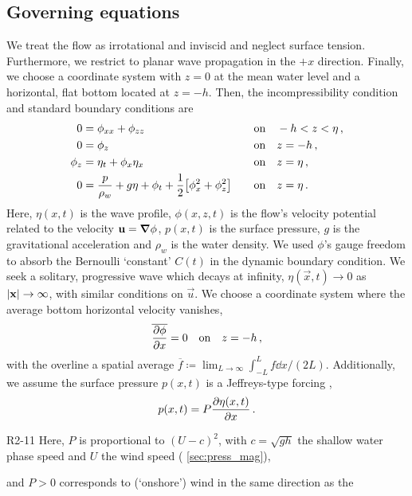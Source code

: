 \documentclass{jfm}
\begin{document}
\subsection{\label{sec:governing} Governing equations}
We treat the flow as irrotational and inviscid and neglect surface
tension.
Furthermore, we restrict to planar wave propagation in the $+x$
direction.
Finally, we choose a coordinate system with $z=0$ at the mean water
level and a horizontal, flat bottom located at $z=-h$.
Then, the incompressibility condition and standard boundary conditions
are
\begin{alignat}{2}
  0 &= \phi_{xx} + \phi_{zz} &&\qq{on}
  -h < z < \eta \,, \label{eq:laplace}\\
  0 &= \phi_{z} &&\qq{on} z=-h \,, \label{eq:bottom_bc}\\
  \phi_{z} &= \eta_{t} + \phi_{x} \eta_{x} &&\qq{on} z = \eta \,,
  \label{eq:kinematic_bc}\\
  0 &= \frac{p}{\rho_w} + g\eta + \phi_{t} +
  \frac{1}{2} \bqty{\phi_{x}^2 + \phi_{z}^2} &&\qq{on} z=
  \eta \,. \label{eq:dynamic_bc}
\end{alignat}
Here, $\eta(x,t)$ is the wave profile, $\phi(x,z,t)$ is the flow's
velocity potential related to the velocity $\mathbf{\bm{u}} = \grad{\phi}$,
$p(x,t)$ is the surface pressure, $g$ is the gravitational acceleration
and $\rho_w$ is the water density.
We used $\phi$'s gauge freedom to absorb the Bernoulli `constant'
$C(t)$ in the dynamic boundary condition.
We seek a solitary, progressive wave which decays at infinity,
$\eta(\vec{x},t) \to 0$ as $\abs{\mathbf{\bm{x}}} \to \infty$, with similar
conditions on $\vec{u}$.
We choose a coordinate system where the average bottom horizontal
velocity vanishes,
\begin{equation}
  \overline{ \pdv{\phi}{x} } = 0 \qq{on} z=-h \,,
  \label{eq:bot_bc_horz}
\end{equation}
with the overline a spatial average $\overline{f} \coloneqq
\lim_{L\to\infty} \int_{-L}^{L} f \dd{x} / (2L)$.
Additionally, we assume the surface pressure $p(x,t)$ is a Jeffreys-type
forcing \citep{jeffreys1925formation},
\begin{equation}
  p(x,t) = P \pdv{\eta(x,t)}{x} \,.
  \label{eq:press_def}
\end{equation}
\begin{LineLabel}{R2-11}
Here, $P$ is proportional to $(U-c)^2$, with $c=\sqrt{gh}$ the shallow
water phase speed and $U$ the wind speed (\cf{} \cref{sec:press_mag}),
\end{LineLabel}
and $P>0$ corresponds to (`onshore') wind in the same direction as the
\end{document}
